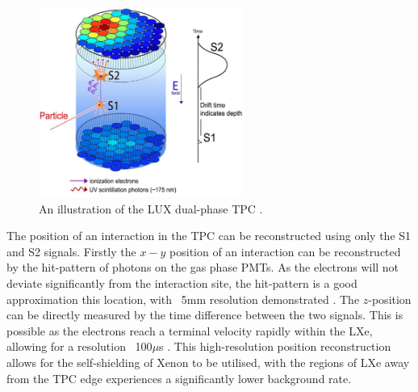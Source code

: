 \begin{figure}
    \centering
    \includegraphics[width=0.6\textwidth]{Figures/LZ/tpc_theory.png}
    \caption{An illustration of the LUX dual-phase TPC \cite{lux_ref}.}
    \label{fig:TPC_theory}
\end{figure}

\par
The position of an interaction in the TPC can be reconstructed using only the S1 and S2 signals.
Firstly the $x-y$ position of an interaction can be reconstructed by the hit-pattern of photons on the gas phase PMTs. 
As the electrons will not deviate significantly from the interaction site, the hit-pattern is a good approximation this location, with ~5mm resolution demonstrated \cite{lux_position_reconstruction_ref}.
The $z$-position can be directly measured by the time difference between the two signals.
This is possible as the electrons reach a terminal velocity rapidly within the LXe, allowing for a resolution ~100$\mu$s \cite{LZ_TechnicalDesignReview_ref}.
This high-resolution position reconstruction allows for the self-shielding of Xenon to be utilised, with the regions of LXe away from the TPC edge experiences a significantly lower background rate.

